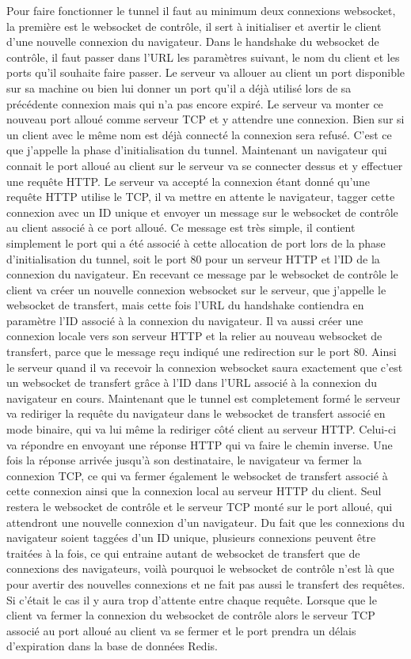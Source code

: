 Pour faire fonctionner le tunnel il faut au minimum deux connexions websocket, la première est le websocket de contrôle, il sert à initialiser et avertir le client d'une nouvelle connexion du navigateur. Dans le handshake du websocket de contrôle, il faut passer dans l'URL les paramètres suivant, le nom du client et les ports qu'il souhaite faire passer. Le serveur va allouer au client un port disponible sur sa machine ou bien lui donner un port qu'il a déjà utilisé lors de sa précédente connexion mais qui n'a pas encore expiré. Le serveur va monter ce nouveau port alloué comme serveur TCP et y attendre une connexion. Bien sur si un client avec le même nom est déjà connecté la connexion sera refusé. C'est ce que j'appelle la phase d'initialisation du tunnel. Maintenant un navigateur qui connait le port alloué au client sur le serveur va se connecter dessus et y effectuer une requête HTTP. Le serveur va accepté la connexion étant donné qu'une requête HTTP utilise le TCP, il va mettre en attente le navigateur, tagger cette connexion avec un ID unique et envoyer un message sur le websocket de contrôle au client associé à ce port alloué. Ce message est très simple, il contient simplement le port qui a été associé à cette allocation de port lors de la phase d'initialisation du tunnel, soit le port 80 pour un serveur HTTP et l'ID de la connexion du navigateur. En recevant ce message par le websocket de contrôle le client va créer un nouvelle connexion websocket sur le serveur, que j'appelle le websocket de transfert, mais cette fois l'URL du handshake contiendra en paramètre l'ID associé à la connexion du navigateur. Il va aussi créer une connexion locale vers son serveur HTTP et la relier au nouveau websocket de transfert, parce que le message reçu indiqué une redirection sur le port 80. Ainsi le serveur quand il va recevoir la connexion websocket saura exactement que c'est un websocket de transfert grâce à l'ID dans l'URL associé à la connexion du navigateur en cours. Maintenant que le tunnel est completement formé le serveur va rediriger la requête du navigateur dans le websocket de transfert associé en mode binaire, qui va lui même la rediriger côté client au serveur HTTP. Celui-ci va répondre en envoyant une réponse HTTP qui va faire le chemin inverse. Une fois la réponse arrivée jusqu'à son destinataire, le navigateur va fermer la connexion TCP, ce qui va fermer également le websocket de transfert associé à cette connexion ainsi que la connexion local au serveur HTTP du client. Seul restera le websocket de contrôle et le serveur TCP monté sur le port alloué, qui attendront une nouvelle connexion d'un navigateur. Du fait que les connexions du navigateur soient taggées d'un ID unique, plusieurs connexions peuvent être traitées à la fois, ce qui entraine autant de websocket de transfert que de connexions des navigateurs, voilà pourquoi le websocket de contrôle n'est là que pour avertir des nouvelles connexions et ne fait pas aussi le transfert des requêtes. Si c'était le cas il y aura trop d'attente entre chaque requête. Lorsque que le client va fermer la connexion du websocket de contrôle alors le serveur TCP associé au port alloué au client va se fermer et le port prendra un délais d'expiration dans la base de données Redis.

